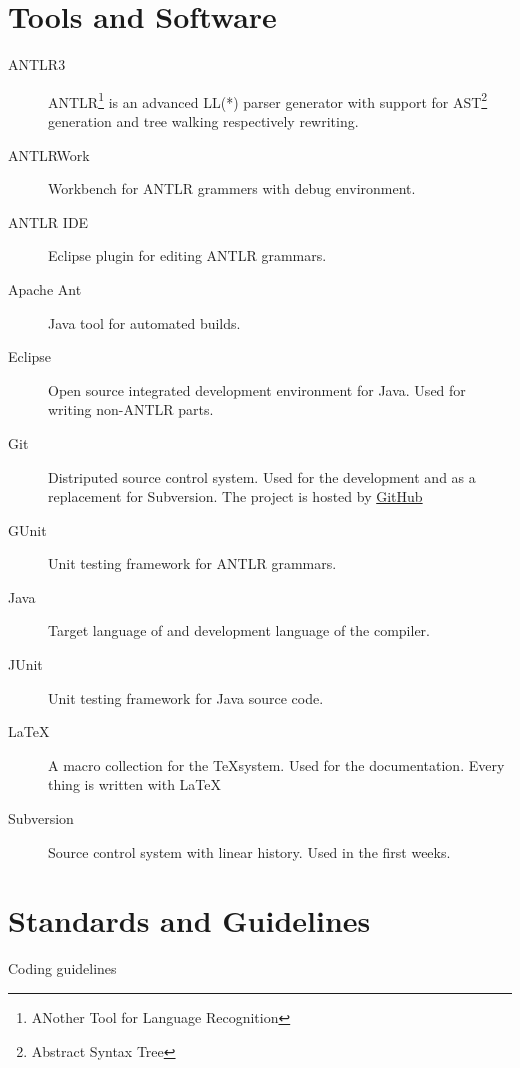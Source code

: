\section{Tools and Software}
\begin{description}
	\item[ANTLR3] ANTLR\footnote{ANother Tool for Language Recognition} is an advanced LL(*) parser generator with support for AST\footnote{Abstract Syntax Tree} generation and tree walking respectively rewriting.
	\item[ANTLRWork] Workbench for ANTLR grammers with debug environment.
	\item[ANTLR IDE] Eclipse plugin for editing ANTLR grammars.
	\item[Apache Ant] Java tool for automated builds.
	\item[Eclipse] Open source integrated development environment for Java. Used for writing non-ANTLR parts.
	\item[Git] Distriputed source control system. Used for the development and as a replacement for Subversion. The project is hosted by \href{https://www.github.com/rubenbaer/ooplss}{GitHub}
	\item[GUnit] Unit testing framework for ANTLR grammars.
	\item[Java] Target language of \ooplss and development language of the compiler.
	\item[JUnit] Unit testing framework for Java source code.
	\item[\LaTeX] A macro collection for the \TeX system. Used for the documentation. Every thing is written with \LaTeX
	\item[Subversion] Source control system with linear history. Used in the first weeks.
\end{description}

\section{Standards and Guidelines}
Coding guidelines

